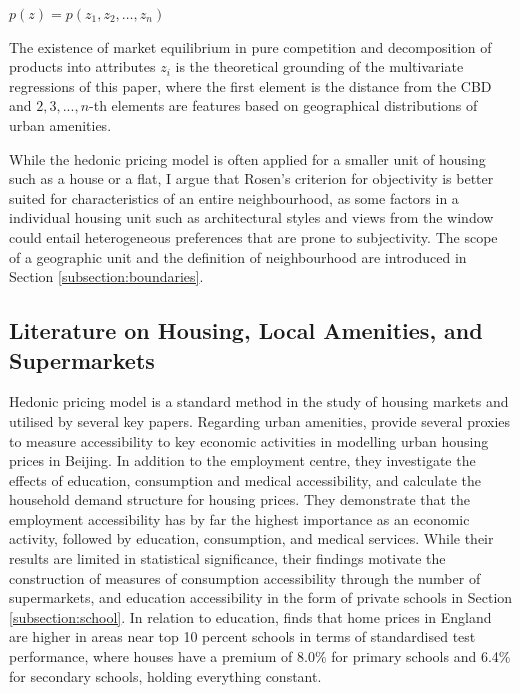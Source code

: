 \documentclass{article}
\begin{document}
\begin{center}
    $p ( z ) = p \left( z _ { 1 } , z _ { 2 } , \dots , z _ { n } \right)$
\end{center}

The existence of market equilibrium in pure competition and decomposition of products into attributes $z_i$ is the theoretical grounding of the multivariate regressions of this paper, where the first element is the distance from the CBD and $2, 3, ..., n$-th elements are features based on geographical distributions of urban amenities.

While the hedonic pricing model is often applied for a smaller unit of housing such as a house or a flat, I argue that Rosen's criterion for objectivity is better suited for characteristics of an entire neighbourhood, as some factors in a individual housing unit such as architectural styles and views from the window could entail heterogeneous preferences that are prone to subjectivity. The scope of a geographic unit and the definition of neighbourhood are introduced in Section \ref{subsection:boundaries}.

\subsection{Literature on Housing, Local Amenities, and Supermarkets} \label{subsection:lit:supermarkets}
Hedonic pricing model is a standard method in the study of housing markets and utilised by several key papers. Regarding urban amenities, \citet{Niu2016ModelingDemand} provide several proxies to measure accessibility to key economic activities in modelling urban housing prices in Beijing. In addition to the employment centre, they investigate the effects of education, consumption and medical accessibility, and calculate the household demand structure for housing prices. They demonstrate that the employment accessibility has by far the highest importance as an economic activity, followed by education, consumption, and medical services. While their results are limited in statistical significance, their findings motivate the construction of measures of consumption accessibility through the number of supermarkets, and education accessibility in the form of private schools in Section \ref{subsection:school}. In relation to education, \citet{DepartmentforEducation2017HouseMore} finds that home prices in England are higher in areas near top 10 percent schools in terms of standardised test performance, where houses have a premium of 8.0\% for primary schools and 6.4\% for secondary schools, holding everything constant.
\end{document}
